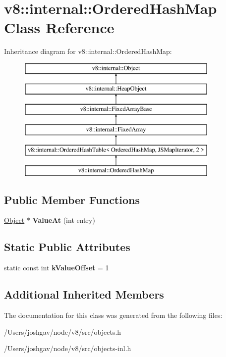 \hypertarget{classv8_1_1internal_1_1_ordered_hash_map}{}\section{v8\+:\+:internal\+:\+:Ordered\+Hash\+Map Class Reference}
\label{classv8_1_1internal_1_1_ordered_hash_map}
Inheritance diagram for v8\+:\+:internal\+:\+:Ordered\+Hash\+Map\+:\begin{figure}[H]
\begin{center}
\leavevmode
\includegraphics[height=6.000000cm]{classv8_1_1internal_1_1_ordered_hash_map}
\end{center}
\end{figure}
\subsection*{Public Member Functions}
\begin{DoxyCompactItemize}
\item 
\hyperlink{classv8_1_1internal_1_1_object}{Object} $\ast$ {\bfseries Value\+At} (int entry)\hypertarget{classv8_1_1internal_1_1_ordered_hash_map_acf8dd66c9107446245606bdfc1a29668}{}\label{classv8_1_1internal_1_1_ordered_hash_map_acf8dd66c9107446245606bdfc1a29668}

\end{DoxyCompactItemize}
\subsection*{Static Public Attributes}
\begin{DoxyCompactItemize}
\item 
static const int {\bfseries k\+Value\+Offset} = 1\hypertarget{classv8_1_1internal_1_1_ordered_hash_map_af9226c777f282b0d357197ff8358cdcf}{}\label{classv8_1_1internal_1_1_ordered_hash_map_af9226c777f282b0d357197ff8358cdcf}

\end{DoxyCompactItemize}
\subsection*{Additional Inherited Members}


The documentation for this class was generated from the following files\+:\begin{DoxyCompactItemize}
\item 
/\+Users/joshgav/node/v8/src/objects.\+h\item 
/\+Users/joshgav/node/v8/src/objects-\/inl.\+h\end{DoxyCompactItemize}
